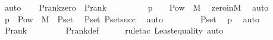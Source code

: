 \begin{isabellebody}
\ auto\ \isanewline
{}\isamarkupfalse%
%
\endisatagproof
{\isafoldproof}%
%
\isadelimproof
\ \isanewline
%
\endisadelimproof
\isanewline
{}\isamarkupfalse%
\ P{\isacharunderscore}{\kern0pt}rank{\isacharunderscore}{\kern0pt}zero\ {\isacharcolon}{\kern0pt}\ {\isachardoublequoteopen}P{\isacharunderscore}{\kern0pt}rank{\isacharparenleft}{\kern0pt}{}{\isacharparenright}{\kern0pt}\ {\isacharequal}{\kern0pt}\ {}{\isachardoublequoteclose}\ \isanewline
%
\isadelimproof
%
\endisadelimproof
%
\isatagproof
{}\isamarkupfalse%
\ {\isacharminus}{\kern0pt}\ \isanewline
\ \ \isamarkupfalse%
\ p{}\ {\isacharcolon}{\kern0pt}\ {\isachardoublequoteopen}{}\ {\isasymin}\ Pow{\isacharparenleft}{\kern0pt}{}{\isacharparenright}{\kern0pt}\ {\isasyminter}\ M{\isachardoublequoteclose}\ \isamarkupfalse%
\ zero{\isacharunderscore}{\kern0pt}in{\isacharunderscore}{\kern0pt}M\ \isamarkupfalse%
\ auto\isanewline
\ \ \isamarkupfalse%
\ p{}\ {\isacharcolon}{\kern0pt}\ {\isachardoublequoteopen}Pow{\isacharparenleft}{\kern0pt}{}{\isacharparenright}{\kern0pt}\ {\isasyminter}\ M\ {\isacharequal}{\kern0pt}\ P{\isacharunderscore}{\kern0pt}set{\isacharparenleft}{\kern0pt}{}{\isacharparenright}{\kern0pt}{\isachardoublequoteclose}\ \isamarkupfalse%
\ P{\isacharunderscore}{\kern0pt}set{\isacharunderscore}{\kern0pt}{}\ P{\isacharunderscore}{\kern0pt}set{\isacharunderscore}{\kern0pt}succ\ \isamarkupfalse%
\ auto\ \isanewline
\ \ \isamarkupfalse%
\ \isamarkupfalse%
\ {\isachardoublequoteopen}{}\ {\isasymin}\ P{\isacharunderscore}{\kern0pt}set{\isacharparenleft}{\kern0pt}{}{\isacharparenright}{\kern0pt}{\isachardoublequoteclose}\ \isamarkupfalse%
\ p{}\ \isamarkupfalse%
\ auto\ \isanewline
\ \ \isamarkupfalse%
\ \isamarkupfalse%
\ {\isachardoublequoteopen}P{\isacharunderscore}{\kern0pt}rank{\isacharparenleft}{\kern0pt}{}{\isacharparenright}{\kern0pt}\ {\isacharequal}{\kern0pt}\ {}{\isachardoublequoteclose}\ \isanewline
\ \ \ \ \isamarkupfalse%
\ P{\isacharunderscore}{\kern0pt}rank{\isacharunderscore}{\kern0pt}def\ \isanewline
\ \ \ \ \isamarkupfalse%
{\isacharparenleft}{\kern0pt}rule{\isacharunderscore}{\kern0pt}tac\ Least{\isacharunderscore}{\kern0pt}equality{\isacharcomma}{\kern0pt}\ auto{\isacharparenright}{\kern0pt}\isanewline

\end{isabellebody}
